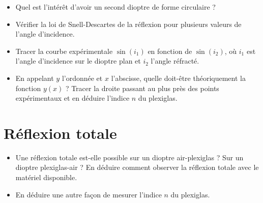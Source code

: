 \documentclass[a4paper]{tp}
\begin{document}
\begin{center}

\end{center}
\begin{itemize}
  \item  Quel est l'intérêt d'avoir un second dioptre de forme circulaire ? 

  \item Vérifier la loi de Snell-Descartes de la réflexion pour plusieurs valeurs de l'angle d'incidence.

  \item Tracer la courbe expérimentale $\sin(i_1)$ en fonction de $\sin(i_2)$, où $i_1$ est l'angle d'incidence sur le dioptre plan et $i_2$ l'angle réfracté.

  \item En appelant $y$ l'ordonnée et $x$ l'abscisse, quelle doit-être théoriquement la fonction $y(x)$ ? Tracer la droite passant au plus près des points expérimentaux et en déduire l'indice $n$ du plexiglas. 
\end{itemize}

\section{Réflexion totale}


\begin{itemize}
  \item Une réflexion totale est-elle possible sur un dioptre air-plexiglas ? Sur un dioptre plexiglas-air ? En déduire comment observer la réflexion totale avec le matériel disponible.
  \item En déduire une autre façon de mesurer l'indice $n$ du plexiglas. 
\end{itemize}
\end{document}

